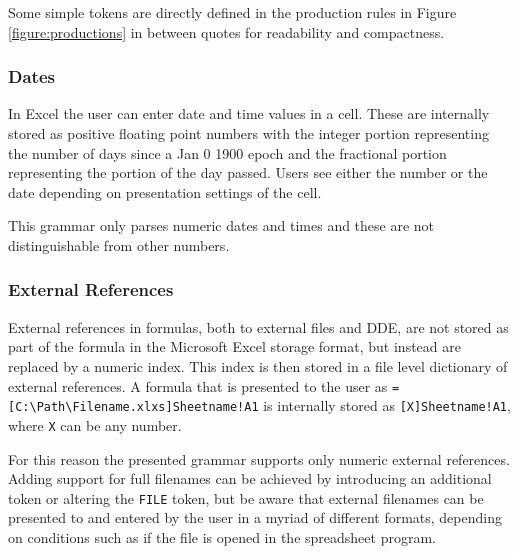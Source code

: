 \documentclass[conference]{IEEEtran}
\begin{document}
Some simple tokens are directly defined in the production rules in Figure \ref{figure:productions} in between quotes for readability and compactness.

\subsubsection{\textbf{Dates}}

In Excel the user can enter date and time values in a cell.
These are internally stored as positive floating point numbers with the integer portion representing the number of days since a Jan 0 1900 epoch and the fractional portion representing the portion of the day passed.
Users see either the number or the date depending on presentation settings of the cell.

This grammar only parses numeric dates and times and these are not distinguishable from other numbers.

\subsubsection{\textbf{External References}}

External references in formulas, both to external files and DDE, are not stored as part of the formula in the Microsoft Excel storage format, but instead are replaced by a numeric index.
This index is then stored in a file level dictionary of external references.
A formula that is presented to the user as \texttt{=[C:\textbackslash Path\textbackslash Filename.xlxs]Sheetname!A1} is internally stored as \texttt{[X]Sheetname!A1}, where \texttt{X} can be any number.

For this reason the presented grammar supports only numeric external references.
Adding support for full filenames can be achieved by introducing an additional token or altering the \texttt{FILE} token, but be aware that external filenames can be presented to and entered by the user in a myriad of different formats, depending on conditions such as if the file is opened in the spreadsheet program.
\end{document}
